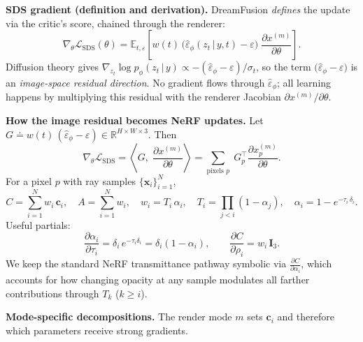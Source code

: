 \begin{enrichment}
\begin{enrichment}
        \medskip
        \noindent
        \textbf{SDS gradient (definition and derivation).}
        DreamFusion \emph{defines} the update via the critic’s score, chained through the renderer:
        \[
        \nabla_\theta \mathcal{L}_{\mathrm{SDS}}(\theta)
        =\mathbb{E}_{t,\varepsilon}\!\left[
        w(t)\,\big(\hat{\varepsilon}_\phi(z_t\,|\,y,t)-\varepsilon\big)\;
        \frac{\partial x^{(m)}}{\partial \theta}
        \right].
        \]
        Diffusion theory gives \(\nabla_{z_t}\log p_\phi(z_t\,|\,y)\propto -(\hat{\varepsilon}_\phi-\varepsilon)/\sigma_t\), so the term
        \(\big(\hat{\varepsilon}_\phi-\varepsilon\big)\) is an \emph{image-space residual direction}. No gradient flows through \(\hat{\varepsilon}_\phi\); all learning happens by multiplying this residual with the renderer Jacobian \(\partial x^{(m)}/\partial\theta\).
        
        \medskip
        \noindent
        \textbf{How the image residual becomes NeRF updates.}
        Let \(G \doteq w(t)\,(\hat{\varepsilon}_\phi-\varepsilon)\in\mathbb{R}^{H\times W\times 3}\).
        Then
        \[
        \nabla_\theta \mathcal{L}_{\mathrm{SDS}}
        = \left\langle G,\; \frac{\partial x^{(m)}}{\partial \theta} \right\rangle
        = \sum_{\text{pixels }p}\; G_p^\top \frac{\partial x^{(m)}_p}{\partial \theta}.
        \]
        For a pixel \(p\) with ray samples \(\{\mathbf{x}_i\}_{i=1}^N\),
        \[
        C=\sum_{i=1}^N w_i\,\mathbf{c}_i,\quad
        A=\sum_{i=1}^N w_i,\quad
        w_i=T_i\,\alpha_i,\quad
        T_i=\prod_{j<i}(1-\alpha_j),\quad
        \alpha_i=1-e^{-\tau_i\,\delta_i}.
        \]
        Useful partials:
        \[
        \frac{\partial \alpha_i}{\partial \tau_i}=\delta_i\,e^{-\tau_i\delta_i}
        =\delta_i(1-\alpha_i),\qquad
        \frac{\partial C}{\partial \rho_i}=w_i\,\mathbf{I}_3.
        \]
        We keep the standard NeRF transmittance pathway symbolic via \(\frac{\partial C}{\partial \alpha_i}\), which accounts for how changing opacity at any sample modulates all farther contributions through \(T_k\) (\(k\ge i\)).
        
        \medskip
        \noindent
        \textbf{Mode-specific decompositions.} The render mode \(m\) sets \(\mathbf{c}_i\) and therefore which parameters receive strong gradients.
        

\end{enrichment}
\end{enrichment}
